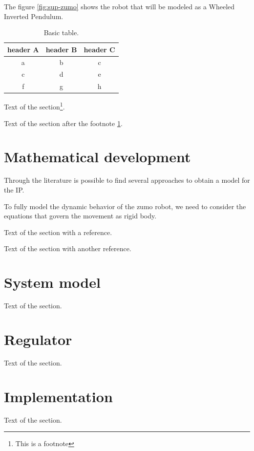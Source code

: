 \documentclass{article}
\begin{document}
The figure \ref{fig:sup-zumo} shows the robot that will be modeled as a Wheeled Inverted Pendulum.

\begin{table}[h!]
	\centering
	\caption{Basic table.}
	\label{tab:tab1}
	\begin{tabular}{ccc}

		\toprule

		header A & header B & header C\\

		\midrule

		a & b & c\\
		c & d & e\\
		f & g & h\\

		\bottomrule

	\end{tabular}
\end{table}

Text of the section\footnote{\label{fn1}This is a footnote}.

Text of the section after the footnote \ref{fn1}.

\section{Mathematical development}

Through the literature is possible to find several approaches to obtain a model for the IP.

To fully model the dynamic behavior of the zumo robot, we need to consider the equations that govern the movement as rigid body.

Text of the section\cite{DOE17} with a reference.

Text of the section\cite{TYSON08} with another reference.

\section{System model}

Text of the section.

\section{Regulator}

Text of the section.

\section{Implementation}

Text of the section.

\begin{appendix}
	\newpage
	\listoffigures
	\newpage
	\listoftables
\end{appendix}

\newpage
\printbibliography
\end{document}
